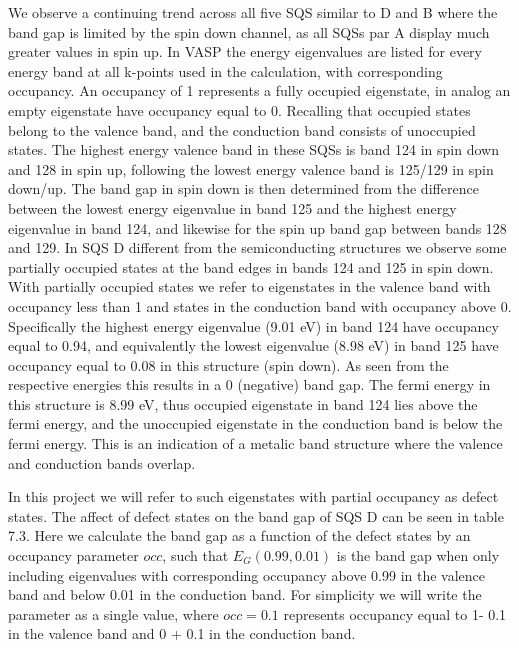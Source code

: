 We observe a continuing trend across all five SQS similar to D and B where the band gap is limited by the spin down channel, as all SQSs par A display much greater values in spin up. In VASP the energy eigenvalues are listed for every energy band at all k-points used in the calculation, with corresponding occupancy. An occupancy of 1 represents a fully occupied eigenstate, in analog an empty eigenstate have occupancy equal to 0. Recalling that occupied states belong to the valence band, and the conduction band consists of unoccupied states. The highest energy valence band in these SQSs is band 124 in spin down and 128 in spin up, following the lowest energy valence band is 125/129 in spin down/up. The band gap in spin down is then determined from the difference between the lowest energy eigenvalue in band 125 and the highest energy eigenvalue in band 124, and likewise for the spin up band gap between bands 128 and 129. In SQS D different from the semiconducting structures we observe some partially occupied states at the band edges in bands 124 and 125 in spin down. With partially occupied states we refer to eigenstates in the valence band with occupancy less than 1 and states in the conduction band with occupancy above 0. Specifically the highest energy eigenvalue (9.01 eV) in band 124 have occupancy equal to 0.94, and equivalently the lowest eigenvalue (8.98 eV) in band 125 have occupancy equal to 0.08 in this structure (spin down). As seen from the respective energies this results in a 0 (negative) band gap. The fermi energy in this structure is 8.99 eV, thus occupied eigenstate in band 124 lies above the fermi energy, and the unoccupied eigenstate in the conduction band is below the fermi energy. This is an indication of a metalic band structure where the valence and conduction bands overlap.  

In this project we will refer to such eigenstates with partial occupancy as defect states. The affect of defect states on the band gap of SQS D can be seen in table 7.3. Here we calculate the band gap as a function of the defect states by an occupancy parameter $occ$, such that $E_G (0.99, 0.01)$ is the band gap when only including eigenvalues with corresponding occupancy above 0.99 in the valence band and below 0.01 in the conduction band. For simplicity we will write the parameter as a single value, where $occ = 0.1$ represents occupancy equal to 1- 0.1 in the valence band and 0 + 0.1 in the conduction band.

